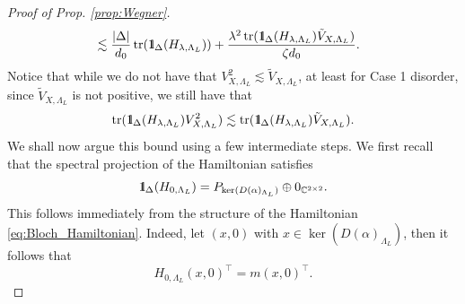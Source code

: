 \documentclass[reqno,12pt,letterpaper]{amsart}
\newcommand{\CC}{{\mathbb C}}
\numberwithin{equation}{section}
\DeclareMathOperator{\tr}{tr}
\def\indic{\operatorname{1\hskip-2.75pt\relax l}}
\begin{document}
\begin{proof}[Proof of Prop. \ref{prop:Wegner}]
\begin{equation}
\begin{split}
&\lesssim \frac{\vert \Delta \vert}{d_0} \tr(\indic_{\Delta}(H_{\lambda,\Lambda_L}) ) +  \frac{\lambda^2 \tr(  \indic_{\Delta}(H_{\lambda,\Lambda_L})\tilde V_{X,\Lambda_L} )}{\zeta d_0}. 
\end{split}
\end{equation}
Notice that while we do not have that $V_{X,\Lambda_L}^2 \lesssim \tilde V_{X,\Lambda_L} $, at least for Case 1 disorder, since $\tilde V_{X,\Lambda_L} $ is not positive, we still have that 
\begin{equation}
\label{eq:estm_fail} 
\tr(  \indic_{\Delta}(H_{\lambda,\Lambda_L})V_{X,\Lambda_L}^2 ) \lesssim  \tr(  \indic_{\Delta}(H_{\lambda,\Lambda_L})\tilde V_{X,\Lambda_L} ).
\end{equation}
We shall now argue this bound using a few intermediate steps. {We first recall that the spectral projection of the Hamiltonian satisfies}
\begin{equation}
\label{eq:projection}
\indic_{\Delta}(H_{0,\Lambda_L}) = P_{\ker(D(\alpha)_{\Lambda_L})} \oplus 0_{\CC^{2 \times 2}}.
\end{equation}
{This follows immediately from the structure of the Hamiltonian \eqref{eq:Bloch_Hamiltonian}. Indeed, let $(x,0)$ with $x \in \ker(D(\alpha)_{\Lambda_L})$, then it follows that 
\[H_{0,\Lambda_L}(x,0)^{\top}=m(x,0)^{\top}.\]  }


\end{proof}
\end{document}
